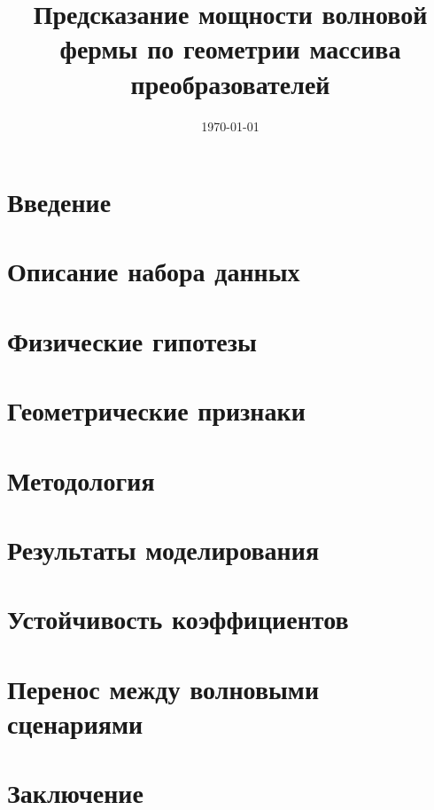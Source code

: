 \documentclass[a4paper,12pt]{article}
\title{Предсказание мощности волновой фермы
по геометрии массива преобразователей}
\author{}
\date{\today}
\begin{document}
\maketitle
\tableofcontents
\newpage

\section{Введение}


\section{Описание набора данных}


\section{Физические гипотезы}


\section{Геометрические признаки}


\section{Методология}


\section{Результаты моделирования}


\section{Устойчивость коэффициентов}


\section{Перенос между волновыми сценариями}


\section{Заключение}




\end{document}
